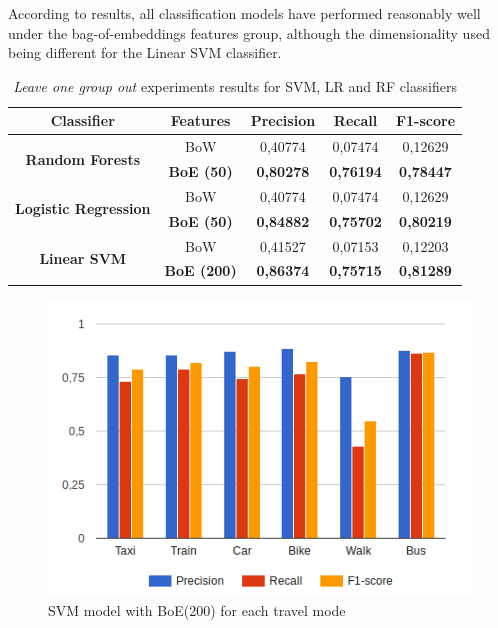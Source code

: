 According to results, all classification models have performed reasonably well under the bag-of-embeddings features group, although the dimensionality used being different for the Linear SVM classifier.

\begin{table}[htbp]
	\small
	\centering
	\caption{\emph{Leave one group out} experiments results for SVM, LR and RF classifiers}
	\label{tab:results}
	\begin{tabular}{|c|c|c|c|c|}
		\hline
		\textbf{Classifier} & \textbf{Features}  & \textbf{Precision} & \textbf{Recall}  & \textbf{F1-score} \\ \hline
		\multirow{2}{*}{\textbf{Random Forests}} & BoW & 0,40774 & 0,07474 & 0,12629  \\
		& \textbf{BoE (50)}  & \textbf{0,80278} & \textbf{0,76194} & \textbf{0,78447}  \\ \hline
		\multirow{2}{*}{\textbf{Logistic Regression}} & BoW & 0,40774 & 0,07474 & 0,12629  \\
		& \textbf{BoE (50)}  & \textbf{0,84882} & \textbf{0,75702} & \textbf{0,80219}  \\ \hline
		\multirow{2}{*}{\textbf{Linear SVM}} & BoW & 0,41527 & 0,07153 & 0,12203  \\
		& \textbf{BoE (200)} & \textbf{0,86374} & \textbf{0,75715} & \textbf{0,81289}  \\ \hline
	\end{tabular}
\end{table}

\begin{figure}[htbp]
	\centering
	\includegraphics[scale=0.7]{figures/svm_linear_leave_one_out_emb_200.png}
	\caption{SVM model with BoE(200) for each travel mode}
	\label{fig:svm_leave}
\end{figure}


